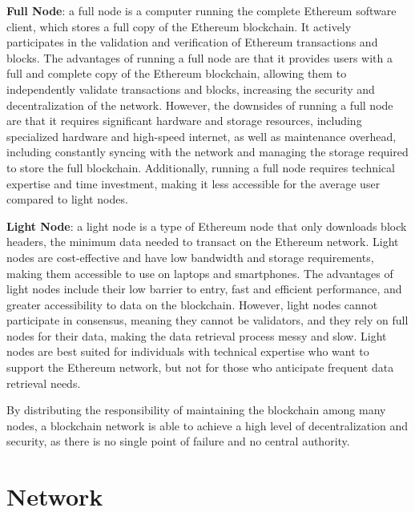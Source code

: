 \documentclass[target=mst,aauheader=]{thud}
\begin{document}
    \textbf{Full Node}: a full node is a computer running the complete Ethereum software client, which stores a full copy of the Ethereum blockchain. It actively participates in the validation and verification of Ethereum transactions and blocks. The advantages of running a full node are that it provides users with a full and complete copy of the Ethereum blockchain, allowing them to independently validate transactions and blocks, increasing the security and decentralization of the network. However, the downsides of running a full node are that it requires significant hardware and storage resources, including specialized hardware and high-speed internet, as well as maintenance overhead, including constantly syncing with the network and managing the storage required to store the full blockchain. Additionally, running a full node requires technical expertise and time investment, making it less accessible for the average user compared to light nodes.\par
    \textbf{Light Node}: a light node is a type of Ethereum node that only downloads block headers, the minimum data needed to transact on the Ethereum network. Light nodes are cost-effective and have low bandwidth and storage requirements, making them accessible to use on laptops and smartphones. The advantages of light nodes include their low barrier to entry, fast and efficient performance, and greater accessibility to data on the blockchain. However, light nodes cannot participate in consensus, meaning they cannot be validators, and they rely on full nodes for their data, making the data retrieval process messy and slow. Light nodes are best suited for individuals with technical expertise who want to support the Ethereum network, but not for those who anticipate frequent data retrieval needs.
            
    By distributing the responsibility of maintaining the blockchain among many nodes, a blockchain network is able to achieve a high level of decentralization and security, as there is no single point of failure and no central authority.
    
    \section{Network}
    
\end{document}
